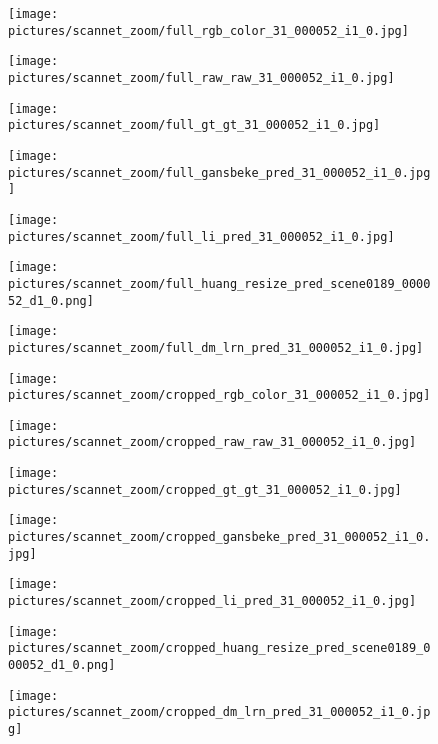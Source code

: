 \documentclass[final]{cvpr}
\begin{document}
    \begin{figure*}[!t]
    \setlength{\columnsep}{2pt}
    \setlength\multicolsep{0pt}
            \begin{multicols}{7}
            \texttt{[image: pictures/scannet\_zoom/full\_rgb\_color\_31\_000052\_i1\_0.jpg]}\par
            \texttt{[image: pictures/scannet\_zoom/full\_raw\_raw\_31\_000052\_i1\_0.jpg]}\par
            \texttt{[image: pictures/scannet\_zoom/full\_gt\_gt\_31\_000052\_i1\_0.jpg]}\par 
            \texttt{[image: pictures/scannet\_zoom/full\_gansbeke\_pred\_31\_000052\_i1\_0.jpg]}\par 
            \texttt{[image: pictures/scannet\_zoom/full\_li\_pred\_31\_000052\_i1\_0.jpg]}\par
            \texttt{[image: pictures/scannet\_zoom/full\_huang\_resize\_pred\_scene0189\_000052\_d1\_0.png]}\par 
            \texttt{[image: pictures/scannet\_zoom/full\_dm\_lrn\_pred\_31\_000052\_i1\_0.jpg]}\par 
        \end{multicols}
        \begin{multicols}{7}
            \texttt{[image: pictures/scannet\_zoom/cropped\_rgb\_color\_31\_000052\_i1\_0.jpg]}\par
            \texttt{[image: pictures/scannet\_zoom/cropped\_raw\_raw\_31\_000052\_i1\_0.jpg]}\par
            \texttt{[image: pictures/scannet\_zoom/cropped\_gt\_gt\_31\_000052\_i1\_0.jpg]}\par 
            \texttt{[image: pictures/scannet\_zoom/cropped\_gansbeke\_pred\_31\_000052\_i1\_0.jpg]}\par 
            \texttt{[image: pictures/scannet\_zoom/cropped\_li\_pred\_31\_000052\_i1\_0.jpg]}\par
            \texttt{[image: pictures/scannet\_zoom/cropped\_huang\_resize\_pred\_scene0189\_000052\_d1\_0.png]}\par 
            \texttt{[image: pictures/scannet\_zoom/cropped\_dm\_lrn\_pred\_31\_000052\_i1\_0.jpg]}\par 
        \end{multicols}


\end{figure*}
\end{document}
